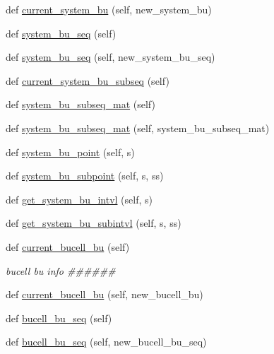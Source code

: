 \begin{DoxyCompactItemize}
def \hyperlink{classonix_1_1sequence_1_1Sequence_af203be1b2457e37f2df77ff79cbef53b}{current\+\_\+system\+\_\+bu} (self, new\+\_\+system\+\_\+bu)
\item 
def \hyperlink{classonix_1_1sequence_1_1Sequence_a43a37d2c202a4a5b912d7ada5c528e0e}{system\+\_\+bu\+\_\+seq} (self)
\item 
def \hyperlink{classonix_1_1sequence_1_1Sequence_af2f0256afee29b6ad9b07153f2bb7c81}{system\+\_\+bu\+\_\+seq} (self, new\+\_\+system\+\_\+bu\+\_\+seq)
\item 
def \hyperlink{classonix_1_1sequence_1_1Sequence_a8372ad59f11b54f4afcab9030a14918e}{current\+\_\+system\+\_\+bu\+\_\+subseq} (self)
\item 
def \hyperlink{classonix_1_1sequence_1_1Sequence_a7b1c3865a12804e84a32a428601afe77}{system\+\_\+bu\+\_\+subseq\+\_\+mat} (self)
\item 
def \hyperlink{classonix_1_1sequence_1_1Sequence_a59ce4ba65b6e12a5a4230ccd6b0f4215}{system\+\_\+bu\+\_\+subseq\+\_\+mat} (self, system\+\_\+bu\+\_\+subseq\+\_\+mat)
\item 
def \hyperlink{classonix_1_1sequence_1_1Sequence_acdfb4ca5840aaee86adf897c81b8d494}{system\+\_\+bu\+\_\+point} (self, s)
\item 
def \hyperlink{classonix_1_1sequence_1_1Sequence_a337a06633a4f3ebc5e04116be4de44f4}{system\+\_\+bu\+\_\+subpoint} (self, s, ss)
\item 
def \hyperlink{classonix_1_1sequence_1_1Sequence_a99650e5369f6b233da5086cb551dc25c}{get\+\_\+system\+\_\+bu\+\_\+intvl} (self, s)
\item 
def \hyperlink{classonix_1_1sequence_1_1Sequence_ad7f3dab9f85da67314654f68923f7812}{get\+\_\+system\+\_\+bu\+\_\+subintvl} (self, s, ss)
\item 
def \hyperlink{classonix_1_1sequence_1_1Sequence_ad4fb0445831abf0eb7bbe1138f09c0b0}{current\+\_\+bucell\+\_\+bu} (self)
\begin{DoxyCompactList}\small\item\em bucell bu info \#\#\#\#\#\# \end{DoxyCompactList}\item 
def \hyperlink{classonix_1_1sequence_1_1Sequence_ad97b33452a77fe96494fb01b210a9fca}{current\+\_\+bucell\+\_\+bu} (self, new\+\_\+bucell\+\_\+bu)
\item 
def \hyperlink{classonix_1_1sequence_1_1Sequence_afb77125acf18a4aa9f7bae89253684f0}{bucell\+\_\+bu\+\_\+seq} (self)
\item 
def \hyperlink{classonix_1_1sequence_1_1Sequence_a9d8dfff357d1253c857116e8ea58fc82}{bucell\+\_\+bu\+\_\+seq} (self, new\+\_\+bucell\+\_\+bu\+\_\+seq)

\end{DoxyCompactItemize}
